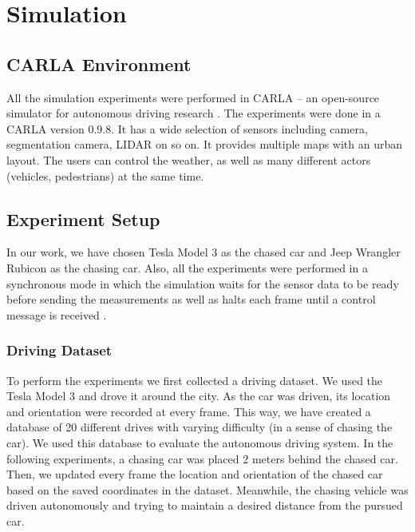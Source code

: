 \documentclass{ctuthesis/ctuthesis}
\begin{document}
\section{Simulation}
\subsection{CARLA Environment}
All the simulation experiments were performed in CARLA -- an open-source simulator for autonomous driving research \cite{CARLA}. The experiments were done in a CARLA version 0.9.8. It has a wide selection of sensors including camera, segmentation camera, LIDAR on so on. It provides multiple maps with an urban layout. The users can control the weather, as well as many different actors (vehicles, pedestrians) at the same time. \par




\subsection{Experiment Setup}
In our work, we have chosen Tesla Model 3 as the chased car and Jeep Wrangler Rubicon as the chasing car. Also, all the experiments were performed in a synchronous mode in which the simulation waits for the sensor data to be ready before sending the measurements as well as halts each frame until a control message is received \cite{CARLA}. \par




\subsubsection{Driving Dataset} \label{s:drivingDataset}
To perform the experiments we first collected a driving dataset. We used the Tesla Model 3 and drove it around the city. As the car was driven, its location and orientation were recorded at every frame. This way, we have created a database of 20 different drives with varying difficulty (in a sense of chasing the car). We used this database to evaluate the autonomous driving system. In the following experiments, a chasing car was placed 2 meters behind the chased car. Then, we updated every frame the location and orientation of the chased car based on the saved coordinates in the dataset. Meanwhile, the chasing vehicle was driven autonomously and trying to maintain a desired distance from the pursued car. \par
\end{document}
